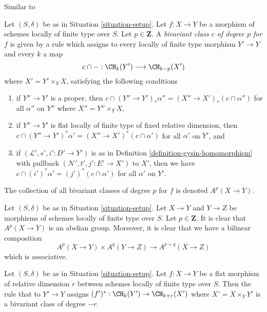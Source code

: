 \begin{definition}
\label{definition-bivariant-class}
\begin{reference}
Similar to \cite[Definition 17.1]{F}
\end{reference}
Let $(S, \delta)$ be as in Situation \ref{situation-setup}.
Let $f : X \to Y$ be a morphism of schemes locally of finite type over $S$.
Let $p \in \mathbf{Z}$.
A {\it bivariant class $c$ of degree $p$ for $f$} is given by a rule
which assigns to every locally of finite type morphism $Y' \to Y$
and every $k$ a map
$$
c \cap - : \CH_k(Y') \longrightarrow \CH_{k - p}(X')
$$
where $X' = Y' \times_Y X$, satisfying the following conditions
\begin{enumerate}
\item if $Y'' \to Y'$ is a proper, then
$c \cap (Y'' \to Y')_*\alpha'' = (X'' \to X')_*(c \cap \alpha'')$
for all $\alpha''$ on $Y''$ where $X'' = Y'' \times_Y X$,
\item if $Y'' \to Y'$ is flat locally of finite type of
fixed relative dimension, then
$c \cap (Y'' \to Y')^*\alpha' = (X'' \to X')^*(c \cap \alpha')$
for all $\alpha'$ on $Y'$, and
\item if $(\mathcal{L}', s', i' : D' \to Y')$ is as in
Definition \ref{definition-gysin-homomorphism}
with pullback $(\mathcal{N}', t', j' : E' \to X')$ to $X'$,
then we have $c \cap (i')^*\alpha' = (j')^*(c \cap \alpha')$
for all $\alpha'$ on $Y'$.
\end{enumerate}
The collection of all bivariant classes of degree $p$ for $f$ is
denoted $A^p(X \to Y)$.
\end{definition}

\noindent
Let $(S, \delta)$ be as in Situation \ref{situation-setup}. Let $X \to Y$
and $Y \to Z$
be morphisms of schemes locally of finite type over $S$. Let
$p \in \mathbf{Z}$. It is clear that $A^p(X \to Y)$ is an abelian group.
Moreover, it is clear that we have a bilinear composition
$$
A^p(X \to Y) \times A^q(Y \to Z) \to A^{p + q}(X \to Z)
$$
which is associative.

\begin{lemma}
\label{lemma-flat-pullback-bivariant}
Let $(S, \delta)$ be as in Situation \ref{situation-setup}.
Let $f : X \to Y$ be a flat morphism of relative dimension $r$
between schemes locally of finite type over $S$.
Then the rule that to $Y' \to Y$ assigns
$(f')^* : \CH_k(Y') \to \CH_{k + r}(X')$ where $X' = X \times_Y Y'$
is a bivariant class of degree $-r$.
\end{lemma}

